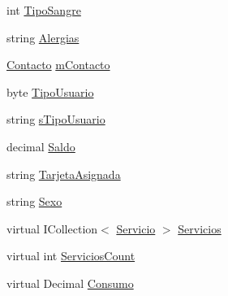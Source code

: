 \begin{DoxyCompactItemize}
\item 
int \hyperlink{class_proyecto___integrador__3_1_1_tipos_dato_1_1_usuario_a03896a1cdb77ff1166088f707b65896c}{Tipo\-Sangre}
\item 
string \hyperlink{class_proyecto___integrador__3_1_1_tipos_dato_1_1_usuario_ab943506068326001f8581e7df6df6c14}{Alergias}
\item 
\hyperlink{struct_proyecto___integrador__3_1_1_tipos_dato_1_1_usuario_1_1_contacto}{Contacto} \hyperlink{class_proyecto___integrador__3_1_1_tipos_dato_1_1_usuario_a2c64e3cc33009cfc51e7f68fb28024e5}{m\-Contacto}
\item 
byte \hyperlink{class_proyecto___integrador__3_1_1_tipos_dato_1_1_usuario_a56f1e08f344ba5851703edab28232278}{Tipo\-Usuario}
\item 
string \hyperlink{class_proyecto___integrador__3_1_1_tipos_dato_1_1_usuario_a11a9f4324ce06becd4385cdf769f5c4e}{s\-Tipo\-Usuario}
\item 
decimal \hyperlink{class_proyecto___integrador__3_1_1_tipos_dato_1_1_usuario_ad29821993f63ad36d711b1e2b90b1be0}{Saldo}
\item 
string \hyperlink{class_proyecto___integrador__3_1_1_tipos_dato_1_1_usuario_a4ecaaf4c0f0b8e78d71fcab8c7da253a}{Tarjeta\-Asignada}
\item 
string \hyperlink{class_proyecto___integrador__3_1_1_tipos_dato_1_1_usuario_ac9a394490635d1d8083c88df4d02a84e}{Sexo}
\item 
virtual I\-Collection$<$ \hyperlink{class_proyecto___integrador__3_1_1_tipos_dato_1_1_servicio}{Servicio} $>$ \hyperlink{class_proyecto___integrador__3_1_1_tipos_dato_1_1_usuario_a95e6bba4296f208230d6374df201f24b}{Servicios}
\item 
virtual int \hyperlink{class_proyecto___integrador__3_1_1_tipos_dato_1_1_usuario_a28988ddc822fdf9d27d55cc2340ab65f}{Servicios\-Count}
\item 
virtual Decimal \hyperlink{class_proyecto___integrador__3_1_1_tipos_dato_1_1_usuario_a17dc01f570b4c27936b81d486fc4a8bb}{Consumo}
\end{DoxyCompactItemize}


